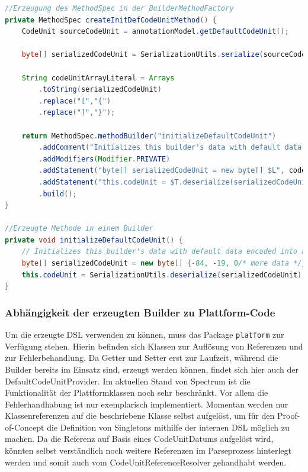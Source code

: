 \documentclass[12pt,oneside,a4paper,parskip]{scrbook}
\begin{document}
\begin{lstlisting}[label=lst:defcu,
language=java,
firstnumber=1,
caption=Quelltext zur Erzeugung des MethodSpecs für die Builder-Methode initializeDefaultCodeUnit und die daraus resultierende konrekte Methode in einem Builder.]
//Erzeugung des MethodSpec in der BuilderMethodFactory
private MethodSpec createInitDefCodeUnitMethod() {
	CodeUnit sourceCodeUnit = annotationModel.getDefaultCodeUnit();
	
	byte[] serializedCodeUnit = SerializationUtils.serialize(sourceCodeUnit);
	
	String codeUnitArrayLiteral = Arrays
		.toString(serializedCodeUnit)
		.replace("[","{")
		.replace("]","}");
	
	return MethodSpec.methodBuilder("initializeDefaultCodeUnit")
		.addComment("Initializes this builder's data with default data encoded into a byte[]")
		.addModifiers(Modifier.PRIVATE)
		.addStatement("byte[] serializedCodeUnit = new byte[] $L", codeUnitArrayLiteral)
		.addStatement("this.codeUnit = $T.deserialize(serializedCodeUnit)", SerializationUtils.class)
		.build();
}

//Erzeugte Methode in einem Builder
private void initializeDefaultCodeUnit() {
	// Initializes this builder's data with default data encoded into a byte[]
	byte[] serializedCodeUnit = new byte[] {-84, -19, 0/* more data */};
	this.codeUnit = SerializationUtils.deserialize(serializedCodeUnit);
}
\end{lstlisting}

\subsubsection{Abhängigkeit der erzeugten Builder zu Plattform-Code}\label{sec:plattform}

Um die erzeugte DSL verwenden zu können, muss das Package \texttt{platform} zur Verfügung stehen. Hierin befinden sich Klassen zur Auflösung von Referenzen und zur Fehlerbehandlung. Da Getter und Setter erst zur Laufzeit, während die Builder bereits im Einsatz sind, erzeugt werden können, findet sich hier auch der DefaultCodeUnitProvider. Im aktuellen Stand von Spectrum ist die Funktionalität der Plattformklassen noch sehr beschränkt. Vor allem die Fehlerhandhabung ist nur exemplarisch implementiert. Momentan werden nur Klassenreferenzen auf die beschriebene Klasse selbst aufgelöst, um für den Proof-of-Concept die Definition von Singletons mithilfe der internen DSL möglich zu machen. Da die Referenz auf Basis eines CodeUnitDatums aufgelöst wird, könnten selbst verständlich noch weitere Referenzen im Parseprozess hinterlegt werden und somit auch vom CodeUnitReferenceResolver gehandhabt werden.
\end{document}
